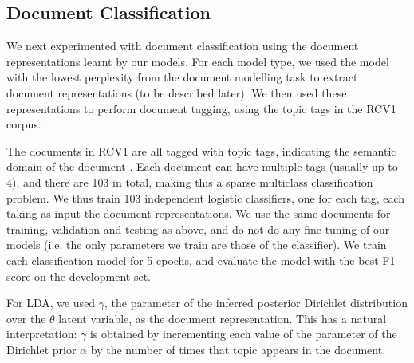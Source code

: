 \subsection{Document Classification}

\begin{table}[t]
    \centering
    \caption{Binary classification accuracy and (microaveraged) F1 on dev and test sets}
    \label{tab:classification}
\end{table}

We next experimented with document classification using the document representations learnt by our models. For each model type, we used the model with the lowest perplexity from the document modelling task to extract document representations (to be described later). We then used these representations to perform document tagging, using the topic tags in the RCV1 corpus. 

The documents in RCV1 are all tagged with topic tags, indicating the semantic domain of the document \citep{Lewis:04}. Each document can have multiple tags (usually up to 4), and there are 103 in total, making this a sparse multiclass classification problem. We thus train 103 independent logistic classifiers, one for each tag, each taking as input the document representations. We use the same documents for training, validation and testing as above, and do not do any fine-tuning of our models (i.e. the only parameters we train are those of the classifier). We train each classification model for 5 epochs, and evaluate the model with the best F1 score on the development set.

For LDA, we used $\gamma$, the parameter of the inferred posterior Dirichlet distribution over the $\theta$ latent variable, as the document representation. This has a natural interpretation: $\gamma$ is obtained by incrementing each value of the parameter of the Dirichlet prior $\alpha$ by the number of times that topic appears in the document. 


